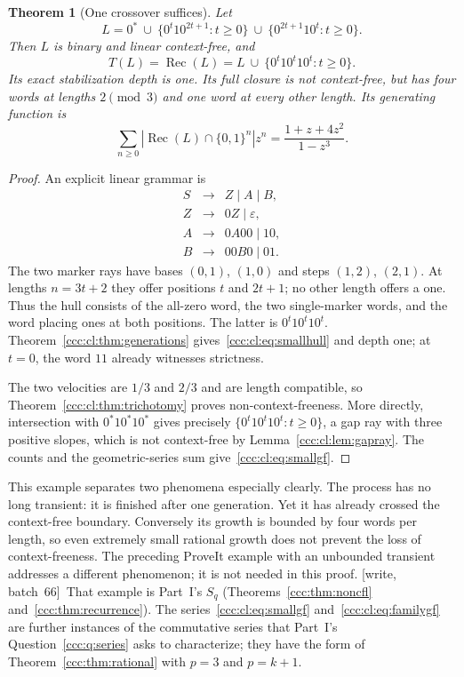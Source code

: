 \documentclass[11pt,letterpaper]{article}
\newtheorem{theorem}{Theorem}[section]
\theoremstyle{definition}
\theoremstyle{remark}
\newcommand{\eps}{\varepsilon}
\newcommand{\rec}{\operatorname{Rec}}
\newcommand{\wsix}{\textup{[write, batch~66]}}
\begin{document}
\begin{theorem}[One crossover suffices]\label{ccc:cl:thm:small}
Let
\begin{equation}\label{ccc:cl:eq:smallseed}
 L=0^*\ \cup\ \{0^t1 0^{2t+1}:t\ge0\}
        \ \cup\ \{0^{2t+1}1 0^t:t\ge0\}.
\end{equation}
Then $L$ is binary and linear context-free, and
\begin{equation}\label{ccc:cl:eq:smallhull}
 T(L)=\rec(L)
 =L\ \cup\ \{0^t1 0^t1 0^t:t\ge0\}.
\end{equation}
Its exact stabilization depth is one. Its full closure is not
context-free, but has four words at lengths $2\pmod3$ and one word at
every other length. Its generating function is
\begin{equation}\label{ccc:cl:eq:smallgf}
 \sum_{n\ge0}|\rec(L)\cap\{0,1\}^n|z^n
 =\frac{1+z+4z^2}{1-z^3}.
\end{equation}
\end{theorem}
\begin{proof}
An explicit linear grammar is
\[
 \begin{array}{rcl}
 S&\to& Z\mid A\mid B,\\
 Z&\to&0Z\mid\eps,\\
 A&\to&0A00\mid10,\\
 B&\to&00B0\mid01.
 \end{array}
\]
The two marker rays have bases $(0,1)$, $(1,0)$ and steps $(1,2)$,
$(2,1)$. At lengths $n=3t+2$ they offer positions $t$ and $2t+1$;
no other length offers a one. Thus the hull consists of the all-zero
word, the two single-marker words, and the word placing ones at both
positions. The latter is $0^t1 0^t1 0^t$.
Theorem~\ref{ccc:cl:thm:generations} gives~\eqref{ccc:cl:eq:smallhull} and depth one;
at $t=0$, the word $11$ already witnesses strictness.

The two velocities are $1/3$ and $2/3$ and are length compatible, so
Theorem~\ref{ccc:cl:thm:trichotomy} proves non-context-freeness. More directly,
intersection with $0^*1 0^*1 0^*$ gives precisely
$\{0^t1 0^t1 0^t:t\ge0\}$, a gap ray with three positive slopes, which
is not context-free by Lemma~\ref{ccc:cl:lem:gapray}. The counts and the
geometric-series sum give~\eqref{ccc:cl:eq:smallgf}.
\end{proof}

This example separates two phenomena especially clearly. The process
has no long transient: it is finished after one generation. Yet it has
already crossed the context-free boundary. Conversely its growth is
bounded by four words per length, so even extremely small rational
growth does not prevent the loss of context-freeness.
The preceding ProveIt example with an unbounded transient addresses a
different phenomenon; it is not needed in this proof.
\wsix\ That example is Part~I's $S_q$ (Theorems~\ref{ccc:thm:noncfl}
and~\ref{ccc:thm:recurrence}). The series~\eqref{ccc:cl:eq:smallgf}
and~\eqref{ccc:cl:eq:familygf} are further instances of the commutative
series that Part~I's Question~\ref{ccc:q:series} asks to characterize; they
have the form of Theorem~\ref{ccc:thm:rational} with $p=3$ and $p=k+1$.
\end{document}
